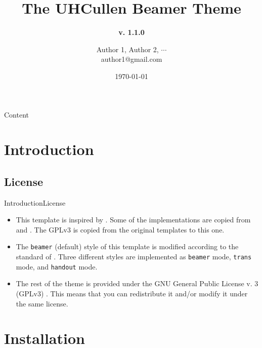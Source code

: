 \documentclass[10pt,xcolor={dvipsnames},aspectratio=169]{beamer}
\title[UHCullen Theme]
{ %
  \textbf{The UHCullen Beamer Theme}
}
\subtitle[v. 1.1.0]
{
\textbf{v. 1.1.0}
}
\author[Author 1]
{Author 1\texorpdfstring{\footnotemark[1]}{},
Author 2\texorpdfstring{\footnotemark[2]}{},
\texorpdfstring{$\cdots$}{...}
\texorpdfstring{ \\
  {\ttfamily author1@gmail.com}
}{}}
\institute[]
{%
  \footnotemark[1]Affiliation 1\\
  \footnotemark[2]Affiliation 2
}
\date{\today} %
\begin{document}

\titleframe

\begin{frame}{Content}{}
\tableofcontents
\end{frame}

\section{Introduction}
\subsection{License}
\begin{frame}{Introduction}{License}

  \begin{itemize}
    \item<1-> This template is inspired by . Some of the implementations are copied from  and . The GPLv3 is copied from the original templates to this one.
    \item<2-> The \texttt{beamer} (default) style of this template is modified according to the standard of . Three different styles are implemented as \texttt{beamer} mode, \texttt{trans} mode, and \texttt{handout} mode.
    \item<3-> The rest of the theme is provided under the GNU General Public License v. 3 (GPLv3) . This means that you can redistribute it and/or modify it under the same license. 
  \end{itemize}
\end{frame}

\section{Installation}
\end{document}
